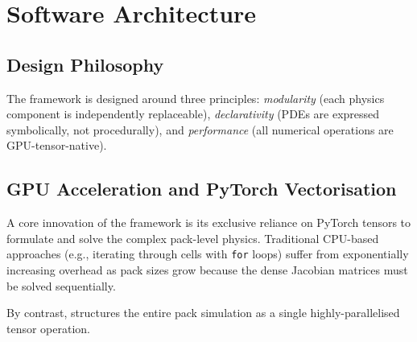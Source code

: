 \chapter{Software Architecture}
\label{ch:software}

\section{Design Philosophy}

The \VIBE{} framework is designed around three principles: \emph{modularity} (each physics component is independently replaceable), \emph{declarativity} (PDEs are expressed symbolically, not procedurally), and \emph{performance} (all numerical operations are GPU-tensor-native).

\section{GPU Acceleration and PyTorch Vectorisation}
\label{sec:gpu_acceleration}

A core innovation of the \VIBE{} framework is its exclusive reliance on PyTorch tensors to formulate and solve the complex pack-level physics. Traditional CPU-based approaches (e.g., iterating through cells with \texttt{for} loops) suffer from exponentially increasing overhead as pack sizes grow because the dense Jacobian matrices must be solved sequentially. 

By contrast, \VIBE{} structures the entire pack simulation as a single highly-parallelised tensor operation. 

